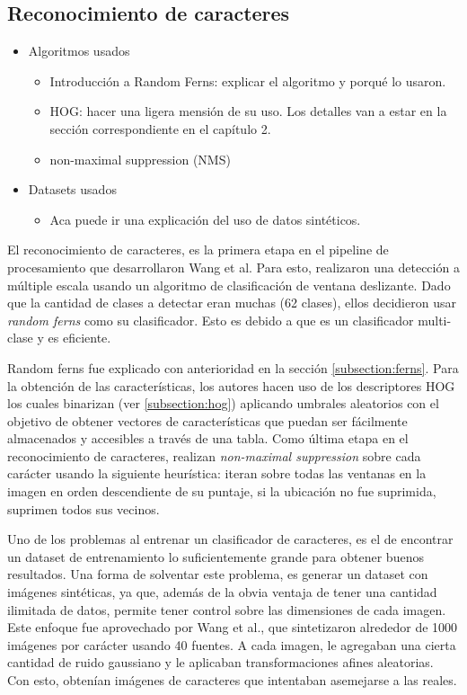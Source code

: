 \subsection{Reconocimiento de caracteres}

	\begin{itemize}
		\item Algoritmos usados
			\begin{itemize}
				\item Introducción a Random Ferns: explicar el algoritmo y porqué lo usaron.
				\item HOG: hacer una ligera mensión de su uso. Los detalles van a estar en la sección correspondiente en el capítulo 2.
				\item non-maximal suppression (NMS)
			\end{itemize}
		\item Datasets usados
			\begin{itemize}
				\item Aca puede ir una explicación del uso de datos sintéticos.			
			\end{itemize}			 
	\end{itemize}
	
	
	El reconocimiento de caracteres, es la primera etapa en el pipeline de procesamiento que desarrollaron Wang et al. Para esto, realizaron una detección a múltiple escala usando un algoritmo de clasificación de ventana deslizante. Dado que la cantidad de clases a detectar eran muchas (62 clases), ellos decidieron usar \textit{random ferns} como su clasificador. Esto es debido a que es un clasificador multi-clase y es eficiente.
	
	Random ferns fue explicado con anterioridad en la sección \ref{subsection:ferns}. Para la obtención de las características, los autores hacen uso de los descriptores HOG  los cuales binarizan (ver \ref{subsection:hog}) aplicando umbrales aleatorios con el objetivo de obtener vectores de características que puedan ser fácilmente almacenados y accesibles a través de una tabla. Como última etapa en el reconocimiento de caracteres, realizan \textit{non-maximal suppression} sobre cada carácter usando la siguiente heurística: iteran sobre todas las ventanas en la imagen en orden descendiente de su puntaje, si la ubicación no fue suprimida, suprimen todos sus vecinos.
	
	Uno de los problemas al entrenar un clasificador de caracteres, es el de encontrar un dataset de entrenamiento lo suficientemente grande para obtener buenos resultados. Una forma de solventar este problema, es generar un dataset con imágenes sintéticas, ya que, además de la  obvia ventaja de tener una cantidad ilimitada de datos, permite tener control sobre las dimensiones de cada imagen. Este enfoque fue aprovechado por Wang et al., que sintetizaron alrededor de 1000 imágenes por carácter usando 40 fuentes. A cada imagen, le agregaban una cierta cantidad de ruido gaussiano y le aplicaban transformaciones afines aleatorias. Con esto, obtenían imágenes de caracteres que intentaban asemejarse a las reales.
	
	